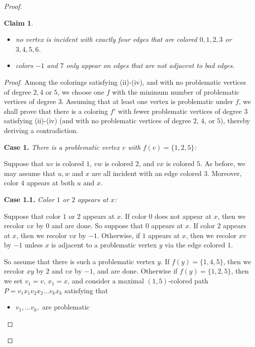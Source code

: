\documentclass[10pt,a4paper]{amsart}
\newtheorem{claim}{Claim}
\begin{document}
\begin{proof}
\begin{claim}
\begin{itemize}
	\item[(iii)] no vertex is incident with exactly four edges that are colored $0,1,2,3$ or $3,4,5,6$.

	\item[(iv)] colors $-1$ and $7$ only  appear on edges that are not adjacent to bad edges.
\end{itemize}
\end{claim}
\begin{proof}
	Among the colorings satisfying (ii)-(iv), and with no problematic vertices of degree
	$2,4$ or $5$,
	we choose one $f$ with the minimum number
	of problematic vertices of degree $3$. Assuming that at least one vertex is problematic under $f$,
	we shall prove that there is a coloring $f'$ with fewer problematic vertices of degree $3$ 
	satisfying (ii)-(iv) (and with no problematic vertices of degree $2$, $4$, or $5$), 
	thereby deriving a contradiction.

	
	\bigskip

	{\bf Case 1.}	 {\em There is a problematic vertex $v$ with $f(v) =\{1,2, 5\}$:}

	Suppose that $uv$ is colored $1$, $vw$ is colored $2$, and $vx$ is colored $5$. As before,
	we may assume that $u,w$ and $x$ are all incident with an edge colored $3$. Moreover, color $4$
	appears at both $u$ and $x$.

	\bigskip

	{\bf Case 1.1.} {\em Color $1$ or $2$ appears at $x$:}

	Suppose that color $1$ or $2$ appears at $x$. If color $0$ does not appear at $x$, then we recolor
	$vx$ by $0$ and are done. So suppose that $0$ appears at $x$. If color $2$ appears at $x$, then
	we recolor $vx$ by $-1$. Otherwise, if $1$ appears at $x$, then we recolor $xv$ by $-1$ unless
	$x$ is adjacent to a problematic vertex $y$ via the edge colored $1$.
	
	So assume that there is such a problematic vertex $y$.
	If $f(y) = \{1,4,5\}$, then we recolor $xy$ by $2$ and $vx$ by $-1$, and are done.
	Otherwise if $f(y) = \{1,2,5\}$, then we set $v_1 = v$, $x_1 = x$, and consider a maximal
	$(1,5)$-colored path $P = v_1 x_1 v_2 x_2 \dots v_k x_k$ satisfying that
\begin{itemize}

	\item $v_1, \dots v_k,$ are problematic


\end{itemize}
\end{proof}
\end{proof}
\end{document}

